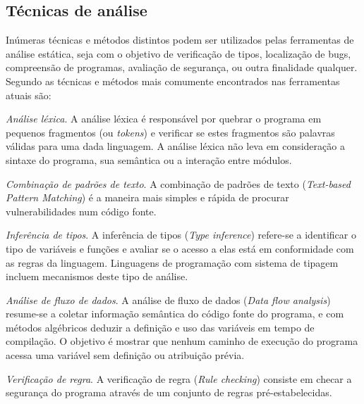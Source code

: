\subsection{Técnicas de análise} \label{tecnicas}

Inúmeras técnicas e métodos distintos podem ser utilizados pelas ferramentas
de análise estática, seja com o objetivo de verificação de tipos, localização
de bugs, compreensão de programas, avaliação de segurança, ou outra finalidade
qualquer. Segundo  as técnicas e
métodos mais comumente encontrados nas ferramentas atuais são:

\begin{description}

  \item \textit{Análise léxica}.
    A análise léxica é responsável por quebrar o programa em pequenos fragmentos
    (ou {\it tokens}) e verificar se estes fragmentos são palavras válidas
    para uma dada linguagem. A análise léxica não leva em consideração a
    sintaxe do programa, sua semântica ou a interação entre módulos.

  \item \textit{Combinação de padrões de texto}.
    A combinação de padrões de texto ({\it Text-based Pattern Matching}) é a
    maneira mais simples e rápida de procurar vulnerabilidades num código
    fonte.

  \item \textit{Inferência de tipos}.
    A inferência de tipos ({\it Type inference}) refere-se a identificar o
    tipo de variáveis e funções e avaliar se o acesso a elas está em
    conformidade com as regras da linguagem. Linguagens de programação com
    sistema de tipagem incluem mecanismos deste tipo de análise.

  \item \textit{Análise de fluxo de dados}.
    A análise de fluxo de dados ({\it Data flow analysis}) resume-se a coletar
    informação semântica do código fonte do programa, e com métodos algébricos
    deduzir a definição e uso das variáveis em tempo de compilação. O objetivo
    é mostrar que nenhum caminho de execução do programa acessa uma variável
    sem definição ou atribuição prévia.

  \item \textit{Verificação de regra}.
    A verificação de regra ({\it Rule checking}) consiste em checar a segurança
    do programa através de um conjunto de regras pré-estabelecidas.


\end{description}
